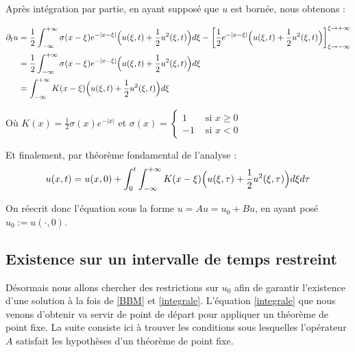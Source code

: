 Après intégration par partie, en ayant supposé que $u$ est bornée, nous obtenons : 

\begin{equation*}
\begin{split}
    \partial_t u &= \frac{1}{2} \int_{-\infty}^{+\infty} \sigma(x - \xi) e^{-|x - \xi|} \Bigl( u(\xi,t) + \frac{1}{2}u^2(\xi,t) \Bigr) d\xi - \biggl[ \frac{1}{2} e^{-|x - \xi|} \Bigl(u(\xi,t) + \frac{1}{2}u^2(\xi,t)\Bigr) \biggr]_{\xi \rightarrow -\infty} ^{\xi \rightarrow +\infty} \\
    &= \frac{1}{2} \int_{-\infty}^{+\infty} \sigma(x - \xi) e^{-|x - \xi|} \Bigl( u(\xi,t) + \frac{1}{2}u^2(\xi,t) \Bigr) d\xi \\
    &= \int_{-\infty}^{+\infty} K(x-\xi) \Bigl( u(\xi,t) + \frac{1}{2}u^2(\xi,t) \Bigr) d\xi
\end{split}
\end{equation*}

Où $K(x) = \frac{1}{2} \sigma(x)e^{-|x|}$ et $\sigma(x) = 
\begin{cases}
    1 &\text{ si } x\geq0 \\
    -1 &\text{ si } x<0
\end{cases}$

\vspace{1em}

Et finalement, par théorème fondamental de l'analyse : 
\begin{equation}
    u(x,t) = u(x,0) + \int_{0}^{t} \int_{-\infty}^{+\infty} K(x-\xi) \Bigl( u(\xi,\tau) + \frac{1}{2}u^2(\xi,\tau) \Bigr) d\xi d\tau \label{integrale}
\end{equation}

\vspace{1em}

On réecrit donc l'équation sous la forme $u = Au = u_0 + Bu$, en ayant posé $u_0 := u(\cdot,0)$.

\vspace{1em}

\subsection{Existence sur un intervalle de temps restreint}

Désormais nous allons chercher des restrictions sur $u_0$ afin de garantir l'existence d'une solution à la fois de \ref{BBM} et \ref{integrale}.
L'équation \ref{integrale} que nous venons d'obtenir va servir de point de départ pour appliquer un théorème de point fixe.
La suite consiste ici à trouver les conditions sous lesquelles l'opérateur $A$ satisfait les hypothèses d'un
théorème de point fixe.

